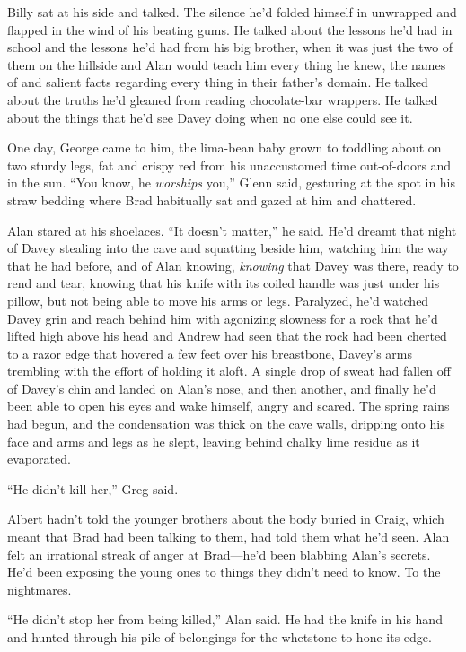 \documentclass{article}
\begin{document}
Billy sat at his side and talked.  The silence he'd folded himself in
unwrapped and flapped in the wind of his beating gums.  He talked
about the lessons he'd had in school and the lessons he'd had from his
big brother, when it was just the two of them on the hillside and Alan
would teach him every thing he knew, the names of and salient facts
regarding every thing in their father's domain.  He talked about the
truths he'd gleaned from reading chocolate-bar wrappers.  He talked
about the things that he'd see Davey doing when no one else could see
it.

One day, George came to him, the lima-bean baby grown to toddling
about on two sturdy legs, fat and crispy red from his unaccustomed
time out-of-doors and in the sun.  ``You know, he \textit{worships}
you,'' Glenn said, gesturing at the spot in his straw bedding where
Brad habitually sat and gazed at him and chattered.

Alan stared at his shoelaces.  ``It doesn't matter,'' he said.  He'd
dreamt that night of Davey stealing into the cave and squatting beside
him, watching him the way that he had before, and of Alan knowing,
\textit{knowing} that Davey was there, ready to rend and tear, knowing
that his knife with its coiled handle was just under his pillow, but
not being able to move his arms or legs.  Paralyzed, he'd watched
Davey grin and reach behind him with agonizing slowness for a rock
that he'd lifted high above his head and Andrew had seen that the rock
had been cherted to a razor edge that hovered a few feet over his
breastbone, Davey's arms trembling with the effort of holding it
aloft.  A single drop of sweat had fallen off of Davey's chin and
landed on Alan's nose, and then another, and finally he'd been able to
open his eyes and wake himself, angry and scared.  The spring rains
had begun, and the condensation was thick on the cave walls, dripping
onto his face and arms and legs as he slept, leaving behind chalky
lime residue as it evaporated.

``He didn't kill her,'' Greg said.

Albert hadn't told the younger brothers about the body buried in
Craig, which meant that Brad had been talking to them, had told them
what he'd seen.  Alan felt an irrational streak of anger at
Brad---he'd been blabbing Alan's secrets.  He'd been exposing the
young ones to things they didn't need to know.  To the nightmares.

``He didn't stop her from being killed,'' Alan said.  He had the knife
in his hand and hunted through his pile of belongings for the
whetstone to hone its edge.
\end{document}
